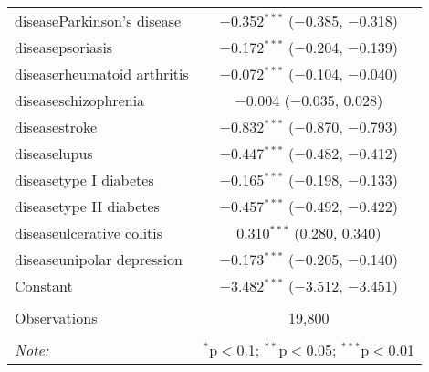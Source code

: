 \begin{table}[!htbp]
\begin{tabular}{@{\extracolsep{5pt}}lc}
  diseaseParkinson's disease & $-$0.352$^{***}$ ($-$0.385, $-$0.318) \\ 
  diseasepsoriasis & $-$0.172$^{***}$ ($-$0.204, $-$0.139) \\ 
  diseaserheumatoid arthritis & $-$0.072$^{***}$ ($-$0.104, $-$0.040) \\ 
  diseaseschizophrenia & $-$0.004 ($-$0.035, 0.028) \\ 
  diseasestroke & $-$0.832$^{***}$ ($-$0.870, $-$0.793) \\ 
  diseaselupus & $-$0.447$^{***}$ ($-$0.482, $-$0.412) \\ 
  diseasetype I diabetes & $-$0.165$^{***}$ ($-$0.198, $-$0.133) \\ 
  diseasetype II diabetes & $-$0.457$^{***}$ ($-$0.492, $-$0.422) \\ 
  diseaseulcerative colitis & 0.310$^{***}$ (0.280, 0.340) \\ 
  diseaseunipolar depression & $-$0.173$^{***}$ ($-$0.205, $-$0.140) \\ 
  Constant & $-$3.482$^{***}$ ($-$3.512, $-$3.451) \\ 
 \hline \\[-1.8ex] 
Observations & 19,800 \\ 
\hline 
\hline \\[-1.8ex] 
\textit{Note:}  & \multicolumn{1}{r}{$^{*}$p$<$0.1; $^{**}$p$<$0.05; $^{***}$p$<$0.01} \\ 
\end{tabular} 
\end{table} 
